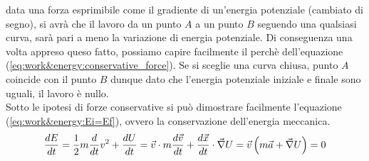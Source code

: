 data una forza esprimibile come il gradiente di un'energia potenziale
(cambiato di segno), si avrà che il lavoro da un punto $A$ a un punto $B$
seguendo una qualsiasi curva, sarà pari a meno la variazione di energia
potenziale. Di conseguenza una volta appreso queso fatto, possiamo capire
facilmente il perchè dell'equazione (\ref{eq:work&energy:conservative_force}).
Se si sceglie una curva chiusa, punto $A$ coincide con il punto $B$ dunque
dato che l'energia potenziale iniziale e finale sono uguali, il lavoro è
nullo.\\
Sotto le ipotesi di forze conservative si può dimostrare facilmente l'equazione
(\ref{eq:work&energy:Ei=Ef}), ovvero la conservazione dell'energia meccanica.
\begin{equation}
    \frac{dE}{dt} = \frac12m\frac{d}{dt}v^2+\frac{dU}{dt} =
    \vec v\cdot m\frac{d\vec v}{dt} + \frac{d\vec x}{dt}\cdot\vec\nabla U =
    \vec v\left( m\vec a + \vec\nabla U\right) = 0
\label{eq:work&energy:energy_conservation}
\end{equation}